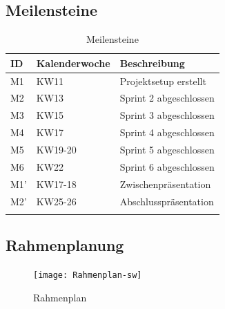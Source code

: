 \newpage
\subsection{Meilensteine}

\begin{longtable}{|p{1cm}|p{2cm}|p{8.5cm}|}
  \hline
    ID & Kalenderwoche &  Beschreibung \\\hline
    M1 & KW11 & Projektsetup erstellt\\\hline
    M2 & KW13 & Sprint 2 abgeschlossen\\\hline
    M3 & KW15 & Sprint 3 abgeschlossen\\\hline
    M4 & KW17 & Sprint 4 abgeschlossen\\\hline
    M5 & KW19-20 & Sprint 5 abgeschlossen\\\hline
    M6 & KW22 & Sprint 6 abgeschlossen\\\hline
    M1' & KW17-18 & Zwischenpräsentation\\\hline
    M2' & KW25-26 & Abschlusspräsentation\\\hline
    \caption{Meilensteine}
  \label{tab:meilensteine}
\end{longtable}
\subsection{Rahmenplanung}
\newpage

\begin{landscape}
\begin{figure}[ht]
\centering
\texttt{[image: Rahmenplan-sw]}
\caption{Rahmenplan}
\label{fig:rahmenplan}
\end{figure}
\end{landscape}

\newpage

